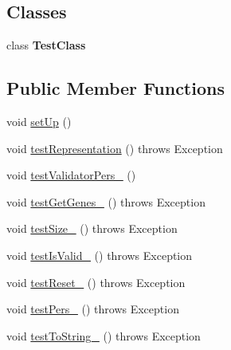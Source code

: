 \subsection*{Classes}
\begin{DoxyCompactItemize}
\item 
class {\bfseries Test\-Class}
\end{DoxyCompactItemize}
\subsection*{Public Member Functions}
\begin{DoxyCompactItemize}
\item 
void \hyperlink{classorg_1_1jgap_1_1supergenes_1_1_supergene_persistent_representation_test_aa1607df82fa4b694161c8b7bcedf1b88}{set\-Up} ()
\item 
void \hyperlink{classorg_1_1jgap_1_1supergenes_1_1_supergene_persistent_representation_test_a4f7b4d7f397cf15125beb755f7b8e30c}{test\-Representation} ()  throws Exception 
\item 
void \hyperlink{classorg_1_1jgap_1_1supergenes_1_1_supergene_persistent_representation_test_a7e1411060cb924b1679a3f8334be9987}{test\-Validator\-Pers\-\_} ()
\item 
void \hyperlink{classorg_1_1jgap_1_1supergenes_1_1_supergene_persistent_representation_test_ab5a6a8dcd4ad1fa441d84df6f1cefdb8}{test\-Get\-Genes\-\_} ()  throws Exception 
\item 
void \hyperlink{classorg_1_1jgap_1_1supergenes_1_1_supergene_persistent_representation_test_acf01ec20fdcef689dbf996a949cc01af}{test\-Size\-\_} ()  throws Exception 
\item 
void \hyperlink{classorg_1_1jgap_1_1supergenes_1_1_supergene_persistent_representation_test_a8edb3e4e45307d76df7be2e9d842171a}{test\-Is\-Valid\-\_} ()  throws Exception 
\item 
void \hyperlink{classorg_1_1jgap_1_1supergenes_1_1_supergene_persistent_representation_test_a6cae74832bb9a8131bed212047974f89}{test\-Reset\-\_} ()  throws Exception 
\item 
void \hyperlink{classorg_1_1jgap_1_1supergenes_1_1_supergene_persistent_representation_test_a777843a0c1db3a99437fd5823d10ff58}{test\-Pers\-\_} ()  throws Exception 
\item 
void \hyperlink{classorg_1_1jgap_1_1supergenes_1_1_supergene_persistent_representation_test_a3c8d5834e11e8a75d2cc1d32d99379f9}{test\-To\-String\-\_} ()  throws Exception 
\item 

\end{DoxyCompactItemize}
